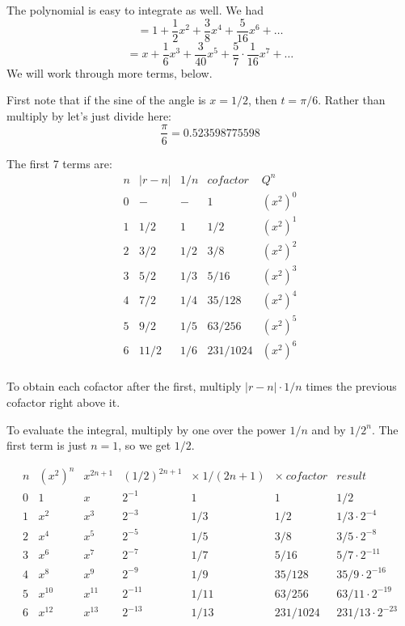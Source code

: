 \documentclass[11pt, oneside]{article}
\begin{document}
The polynomial is easy to integrate as well.  We had
\[ = 1 + \frac{1}{2}x^2 + \frac{3}{8} x^4 + \frac{5}{16} x^6 + \dots \]
\[ = x + \frac{1}{6}x^3 + \frac{3}{40} x^5 + \frac{5}{7} \cdot \frac{1}{16} x^7 + \dots \]
We will work through more terms, below.

First note that if the sine of the angle is $x = 1/2$, then $t = \pi/6$.  Rather than multiply by let's just divide here:
\[ \frac{\pi}{6} = 0.523598775598 \]

The first 7 terms are:
\[
\begin{matrix}
n & |r-n| & 1/n & cofactor & Q^n  \\
0  & - & - & 1 & (x^2)^0 \\
1 & 1/2 & 1 & 1/2 & (x^2)^1 \\
2 & 3/2 & 1/2 & 3/8 & (x^2)^2  \\
3 & 5/2 & 1/3 &  5/16 & (x^2)^3  \\
4 & 7/2 & 1/4 &  35/128 & (x^2)^4  \\
5 & 9/2  & 1/5 &  63/256  & (x^2)^5 \\
6 & 11/2  & 1/6 &  231/1024  & (x^2)^6  \\
\end{matrix}
\] 

To obtain each cofactor after the first, multiply $|r-n| \cdot 1/n$ times the previous cofactor right above it.

To evaluate the integral, multiply by one over the power $1/n$ and by $1/2^n$.  The first term is just $n=1$, so we get $1/2$.

\[
\begin{matrix}
n & (x^2)^n & x^{2n+1} & (1/2)^{2n+1} & \times \ 1/(2n+1) & \times \ cofactor & result  \\
0  & 1 & x  & 2^{-1} & 1 & 1 & 1/2 \\
1  & x^2 & x^3  & 2^{-3} & 1/3 & 1/2 & 1/3 \cdot 2^{-4} \\
2  & x^4 & x^5  & 2^{-5} & 1/5 & 3/8 &  3/5 \cdot 2^{-8}  \\
3  & x^6 & x^7  & 2^{-7} & 1/7 &  5/16 & 5/7 \cdot  2^{-11}  \\
4  & x^8 & x^9  & 2^{-9} & 1/9 &  35/128 & 35/9 \cdot 2^{-16}  \\
5  & x^{10} & x^{11}  & 2^{-11}  & 1/11 &  63/256  &  63/11 \cdot 2^{-19} \\
6  & x^{12} & x^{13}  & 2^{-13}  & 1/13 &  231/1024  &  231/13 \cdot 2^{-23}  \\
\end{matrix}
\] 
\end{document}
